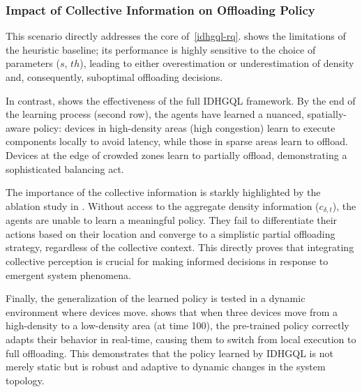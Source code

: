 \subsubsection{Impact of Collective Information on Offloading Policy}
This scenario directly addresses the core of~\ref{idhgql-rq}. 
 shows the limitations of the heuristic baseline; 
its performance is highly sensitive to the choice of parameters ($s$, $th$), 
leading to either overestimation or underestimation of density and, 
consequently, suboptimal offloading decisions.

In contrast, 
 shows the effectiveness of the full IDHGQL framework. 
By the end of the learning process (second row), 
the agents have learned a nuanced, spatially-aware policy: 
devices in high-density areas (high congestion) learn to execute components locally to avoid latency, while those in sparse areas learn to offload. 
Devices at the edge of crowded zones learn to partially offload, demonstrating a sophisticated balancing act.

The importance of the collective information is starkly highlighted by the ablation study in . 
Without access to the aggregate density information ($c_{\delta,t}$), 
 the agents are unable to learn a meaningful policy. 
 They fail to differentiate their actions based on their location and 
 converge to a simplistic partial offloading strategy, 
 regardless of the collective context. 
 This directly proves that integrating collective perception is crucial for making informed decisions in response to emergent system phenomena.

Finally, 
 the generalization of the learned policy is tested in a dynamic environment where devices move.  
  shows that when three devices move from a high-density to a low-density area (at time 100), 
  the pre-trained policy correctly adapts their behavior in real-time, 
  causing them to switch from local execution to full offloading. 
  This demonstrates that the policy learned by IDHGQL is not merely static 
  but is robust and adaptive to dynamic changes in the system topology.

